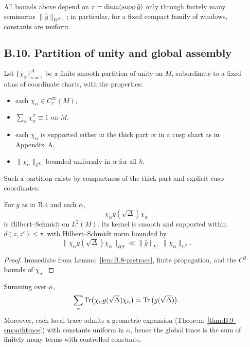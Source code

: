 \begin{remark}\label{rmk:B.9-width}
All bounds above depend on $\tau=\operatorname{diam}(\operatorname{supp}\widehat g)$ only through finitely many seminorms
$\|\widehat g\|_{W^{N,1}}$; in particular, for a fixed compact family of windows, constants are uniform.
\end{remark}

\subsection*{B.10. Partition of unity and global assembly}

\noindent
Let $\{\chi_\alpha\}_{\alpha=1}^A$ be a finite smooth partition of unity on $M$,
subordinate to a fixed atlas of coordinate charts, with the properties:
\begin{itemize}
  \item each $\chi_\alpha\in C_c^\infty(M)$,
  \item $\sum_\alpha \chi_\alpha^2 \equiv 1$ on $M$,
  \item each $\chi_\alpha$ is supported either in the thick part or in a cusp chart as in Appendix~A,
  \item $\|\chi_\alpha\|_{C^k}$ bounded uniformly in $\alpha$ for all $k$.
\end{itemize}
Such a partition exists by compactness of the thick part and explicit cusp coordinates.

\begin{lemma}\label{lem:B.10-HS}
For $g$ as in B.4 and each $\alpha$,
\[
\chi_\alpha g(\sqrt\Delta)\chi_\alpha
\]
is Hilbert--Schmidt on $L^2(M)$. Its kernel is smooth and supported within
$d(z,z')\le \tau$, with Hilbert--Schmidt norm bounded by
\[
\|\chi_\alpha g(\sqrt\Delta)\chi_\alpha\|_{HS} \ll \|\widehat g\|_{L^1}\, \|\chi_\alpha\|_{C^2}.
\]
\end{lemma}

\begin{proof}
Immediate from Lemma~\ref{lem:B.8-pretrace}, finite propagation, and the $C^2$ bounds of $\chi_\alpha$.
\end{proof}

\begin{proposition}\label{prop:B.10-glue}
Summing over $\alpha$,
\[
\sum_\alpha \operatorname{Tr}\!\big(\chi_\alpha g(\sqrt\Delta)\chi_\alpha\big)
= \operatorname{Tr}\big(g(\sqrt\Delta)\big).
\]
Moreover, each local trace admits a geometric expansion (Theorem~\ref{thm:B.9-smoothtrace})
with constants uniform in $\alpha$, hence the global trace is the sum of finitely many
terms with controlled constants.
\end{proposition}

